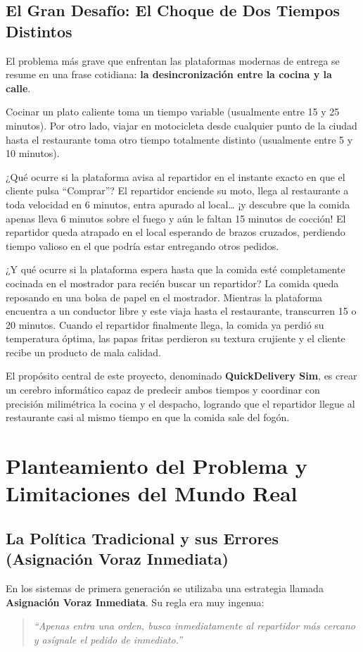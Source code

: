 \documentclass[11pt,a4paper]{article}
\begin{document}
\subsection{El Gran Desafío: El Choque de Dos Tiempos Distintos}
El problema más grave que enfrentan las plataformas modernas de entrega se resume en una frase cotidiana: \textbf{la desincronización entre la cocina y la calle}.

Cocinar un plato caliente toma un tiempo variable (usualmente entre 15 y 25 minutos). Por otro lado, viajar en motocicleta desde cualquier punto de la ciudad hasta el restaurante toma otro tiempo totalmente distinto (usualmente entre 5 y 10 minutos).

¿Qué ocurre si la plataforma avisa al repartidor en el instante exacto en que el cliente pulsa ``Comprar''?
El repartidor enciende su moto, llega al restaurante a toda velocidad en 6 minutos, entra apurado al local\dots{} ¡y descubre que la comida apenas lleva 6 minutos sobre el fuego y aún le faltan 15 minutos de cocción!
El repartidor queda atrapado en el local esperando de brazos cruzados, perdiendo tiempo valioso en el que podría estar entregando otros pedidos.

¿Y qué ocurre si la plataforma espera hasta que la comida esté completamente cocinada en el mostrador para recién buscar un repartidor?
La comida queda reposando en una bolsa de papel en el mostrador. Mientras la plataforma encuentra a un conductor libre y este viaja hasta el restaurante, transcurren 15 o 20 minutos. Cuando el repartidor finalmente llega, la comida ya perdió su temperatura óptima, las papas fritas perdieron su textura crujiente y el cliente recibe un producto de mala calidad.

El propósito central de este proyecto, denominado \textbf{QuickDelivery Sim}, es crear un cerebro informático capaz de predecir ambos tiempos y coordinar con precisión milimétrica la cocina y el despacho, logrando que el repartidor llegue al restaurante casi al mismo tiempo en que la comida sale del fogón.

\section{Planteamiento del Problema y Limitaciones del Mundo Real}

\subsection{La Política Tradicional y sus Errores (Asignación Voraz Inmediata)}
En los sistemas de primera generación se utilizaba una estrategia llamada \textbf{Asignación Voraz Inmediata}. Su regla era muy ingenua:
\begin{quote}
\textit{``Apenas entra una orden, busca inmediatamente al repartidor más cercano y asígnale el pedido de inmediato.''}
\end{quote}
\end{document}

